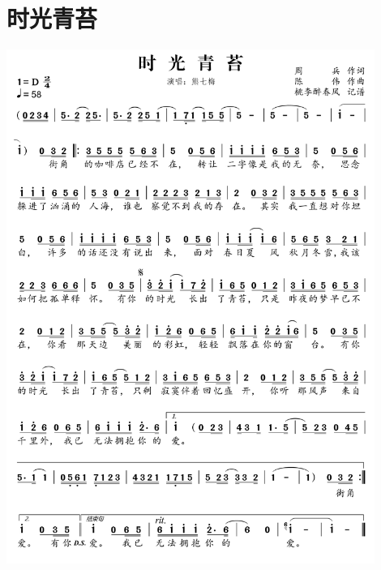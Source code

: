 \documentclass[cn,pad,twocol]{elegantbook}
\begin{document}
\section{时光青苔} \includegraphics[width=0.9\textwidth]{rpi400/20210212时光青苔.png}
\end{document}
